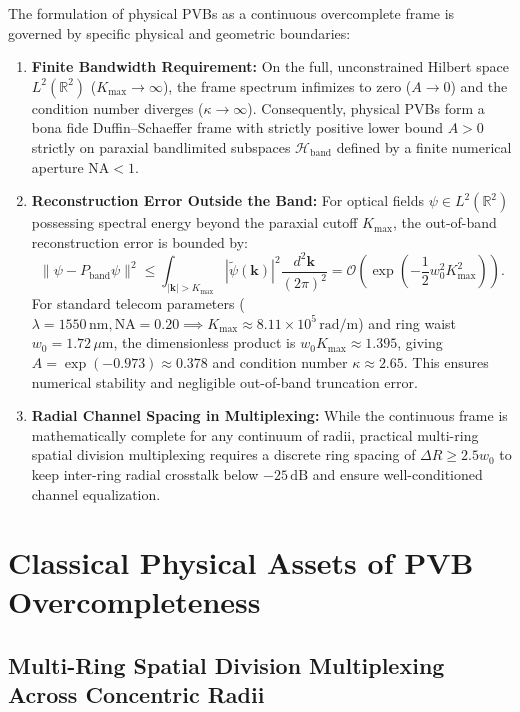 \documentclass[11pt,a4paper]{article}
\begin{document}
The formulation of physical PVBs as a continuous overcomplete frame is governed by specific physical and geometric boundaries:
\begin{enumerate}
    \item \textbf{Finite Bandwidth Requirement:} On the full, unconstrained Hilbert space $L^2(\mathbb{R}^2)$ ($K_{\max} \to \infty$), the frame spectrum infimizes to zero ($A \to 0$) and the condition number diverges ($\kappa \to \infty$). Consequently, physical PVBs form a bona fide Duffin--Schaeffer frame with strictly positive lower bound $A > 0$ strictly on paraxial bandlimited subspaces $\mathcal{H}_{\text{band}}$ defined by a finite numerical aperture $\text{NA} < 1$.
    \item \textbf{Reconstruction Error Outside the Band:} For optical fields $\psi \in L^2(\mathbb{R}^2)$ possessing spectral energy beyond the paraxial cutoff $K_{\max}$, the out-of-band reconstruction error is bounded by:
    \begin{equation}
    \|\psi - P_{\text{band}} \psi\|^2 \le \int_{|\mathbf{k}| > K_{\max}} |\widetilde{\psi}(\mathbf{k})|^2 \frac{d^2\mathbf{k}}{(2\pi)^2} = \mathcal{O}\left( \exp\left( - \frac{1}{2} w_0^2 K_{\max}^2 \right) \right).
    \label{eq:out_of_band_error}
    \end{equation}
    For standard telecom parameters ($\lambda = 1550\,\text{nm}, \text{NA} = 0.20 \implies K_{\max} \approx 8.11 \times 10^5\,\text{rad/m}$) and ring waist $w_0 = 1.72\,\mu\text{m}$, the dimensionless product is $w_0 K_{\max} \approx 1.395$, giving $A = \exp(-0.973) \approx 0.378$ and condition number $\kappa \approx 2.65$. This ensures numerical stability and negligible out-of-band truncation error.
    \item \textbf{Radial Channel Spacing in Multiplexing:} While the continuous frame is mathematically complete for any continuum of radii, practical multi-ring spatial division multiplexing requires a discrete ring spacing of $\Delta R \ge 2.5 w_0$ to keep inter-ring radial crosstalk below $-25\,\text{dB}$ and ensure well-conditioned channel equalization.
\end{enumerate}

\section{Classical Physical Assets of PVB Overcompleteness}
\label{sec:classical_assets}

\subsection{Multi-Ring Spatial Division Multiplexing Across Concentric Radii}
\end{document}
